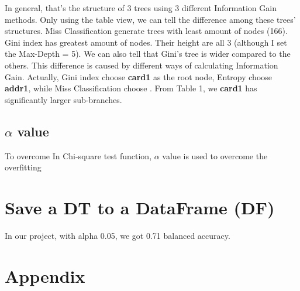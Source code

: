 \documentclass{article}
\begin{document}
In general, that's the structure of 3 trees using 3 different Information Gain methods. Only using the table view, we can tell the difference among these trees' structures. Miss Classification generate trees with least amount of nodes (166). Gini index has greatest amount of nodes. Their height are all 3 (although I set the Max-Depth = 5). We can also tell that Gini's tree is wider compared to the others. This difference is caused by different ways of calculating Information Gain. Actually, Gini index choose \textbf{card1} as the root node, Entropy choose \textbf{addr1}, while Miss Classification choose . From Table 1, we \textbf{card1} has significantly larger sub-branches. 



\subsection{$\alpha$ value}

To overcome In Chi-square test function, $\alpha$ value is used to overcome the overfitting 




\section{Save a DT to a DataFrame (DF)}



In our project, with alpha 0.05, we got 0.71 balanced accuracy. 



\section{Appendix}
\end{document}
